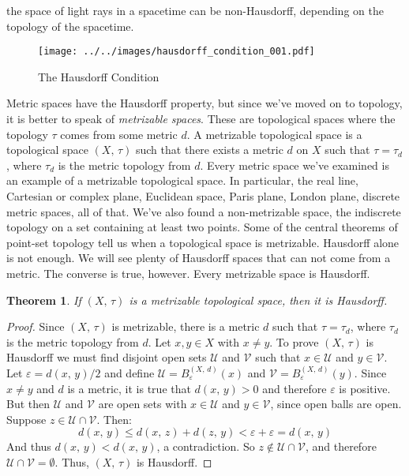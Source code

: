 \documentclass{article}
\theoremstyle{plain}
\newtheorem{theorem}{Theorem}[section]
\theoremstyle{normal}
\newenvironment{definition}{%
    \pushQED{\qed}\renewcommand{\qedsymbol}{$\blacksquare$}\definitionx%
}{%
    \popQED\enddefinitionx%
}
\begin{document}
    the space of light rays in a spacetime can be non-Hausdorff, depending on
    the topology of the spacetime.
    \par\hfill\par
    \begin{figure}
        \centering
        \texttt{[image: ../../images/hausdorff\_condition\_001.pdf]}
        \caption{The Hausdorff Condition}
        \label{fig:hausdorff_condition_001}
    \end{figure}
    Metric spaces have the Hausdorff property, but since we've moved on to
    topology, it is better to speak of \textit{metrizable spaces}. These are
    topological spaces where the topology $\tau$ comes from some metric $d$.
    \begin{definition}[\textbf{Metrizable Topological Space}]
        A metrizable topological space is a topological space $(X,\,\tau)$ such
        that there exists a metric $d$ on $X$ such that $\tau=\tau_{d}$,
        where $\tau_{d}$ is the metric topology from $d$.
    \end{definition}
    Every metric space we've examined is an example of a metrizable topological
    space. In particular, the real line, Cartesian or complex plane,
    Euclidean space, Paris plane, London plane, discrete metric spaces,
    all of that. We've also found a non-metrizable space, the indiscrete
    topology on a set containing at least two points. Some of the central
    theorems of point-set topology tell us when a topological space is
    metrizable. Hausdorff alone is not enough. We will see plenty of Hausdorff
    spaces that can not come from a metric. The converse is true, however. Every
    metrizable space is Hausdorff.
    \begin{theorem}
        If $(X,\,\tau)$ is a metrizable topological space, then it is
        Hausdorff.
    \end{theorem}
    \begin{proof}
        Since $(X,\,\tau)$ is metrizable, there is a metric $d$ such that
        $\tau=\tau_{d}$, where $\tau_{d}$ is the metric topology from $d$.
        Let $x,y\in{X}$ with $x\ne{y}$. To prove $(X,\,\tau)$ is Hausdorff we
        must find disjoint open sets $\mathcal{U}$ and $\mathcal{V}$ such that
        $x\in\mathcal{U}$ and $y\in\mathcal{V}$. Let
        $\varepsilon=d(x,\,y)/2$ and define
        $\mathcal{U}=B_{\varepsilon}^{(X,\,d)}(x)$ and
        $\mathcal{V}=B_{\varepsilon}^{(X,\,d)}(y)$. Since $x\ne{y}$ and $d$
        is a metric, it is true that $d(x,\,y)>0$ and therefore $\varepsilon$
        is positive. But then $\mathcal{U}$ and $\mathcal{V}$ are open sets
        with $x\in\mathcal{U}$ and $y\in\mathcal{V}$, since open balls are open.
        Suppose $z\in\mathcal{U}\cap\mathcal{V}$. Then:
        \begin{equation}
            d(x,\,y)
            \leq{d}(x,\,z)+d(z,\,y)
            <\varepsilon+\varepsilon
            =d(x,\,y)
        \end{equation}
        And thus $d(x,\,y)<d(x,\,y)$, a contradiction. So
        $z\notin\mathcal{U}\cap\mathcal{V}$, and therefore
        $\mathcal{U}\cap\mathcal{V}=\emptyset$. Thus, $(X,\,\tau)$ is
        Hausdorff.
    \end{proof}
\end{document}
